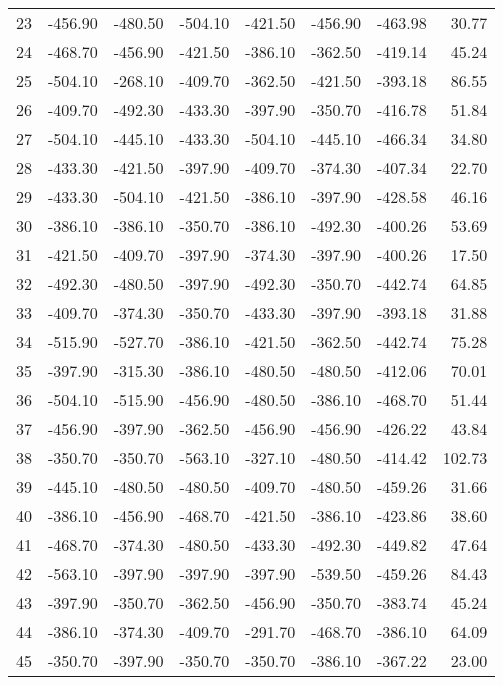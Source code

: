 \begin{longtable}{rrrrrrrr}
23 & -456.90 & -480.50 & -504.10 & -421.50 & -456.90 & -463.98 & 30.77  \\
24 & -468.70 & -456.90 & -421.50 & -386.10 & -362.50 & -419.14 & 45.24  \\
25 & -504.10 & -268.10 & -409.70 & -362.50 & -421.50 & -393.18 & 86.55  \\
26 & -409.70 & -492.30 & -433.30 & -397.90 & -350.70 & -416.78 & 51.84  \\
27 & -504.10 & -445.10 & -433.30 & -504.10 & -445.10 & -466.34 & 34.80  \\
28 & -433.30 & -421.50 & -397.90 & -409.70 & -374.30 & -407.34 & 22.70  \\
29 & -433.30 & -504.10 & -421.50 & -386.10 & -397.90 & -428.58 & 46.16  \\
30 & -386.10 & -386.10 & -350.70 & -386.10 & -492.30 & -400.26 & 53.69  \\
31 & -421.50 & -409.70 & -397.90 & -374.30 & -397.90 & -400.26 & 17.50  \\
32 & -492.30 & -480.50 & -397.90 & -492.30 & -350.70 & -442.74 & 64.85  \\
33 & -409.70 & -374.30 & -350.70 & -433.30 & -397.90 & -393.18 & 31.88  \\
34 & -515.90 & -527.70 & -386.10 & -421.50 & -362.50 & -442.74 & 75.28  \\
35 & -397.90 & -315.30 & -386.10 & -480.50 & -480.50 & -412.06 & 70.01  \\
36 & -504.10 & -515.90 & -456.90 & -480.50 & -386.10 & -468.70 & 51.44  \\
37 & -456.90 & -397.90 & -362.50 & -456.90 & -456.90 & -426.22 & 43.84  \\
38 & -350.70 & -350.70 & -563.10 & -327.10 & -480.50 & -414.42 & 102.73  \\
39 & -445.10 & -480.50 & -480.50 & -409.70 & -480.50 & -459.26 & 31.66  \\
40 & -386.10 & -456.90 & -468.70 & -421.50 & -386.10 & -423.86 & 38.60  \\
41 & -468.70 & -374.30 & -480.50 & -433.30 & -492.30 & -449.82 & 47.64  \\
42 & -563.10 & -397.90 & -397.90 & -397.90 & -539.50 & -459.26 & 84.43  \\
43 & -397.90 & -350.70 & -362.50 & -456.90 & -350.70 & -383.74 & 45.24  \\
44 & -386.10 & -374.30 & -409.70 & -291.70 & -468.70 & -386.10 & 64.09  \\
45 & -350.70 & -397.90 & -350.70 & -350.70 & -386.10 & -367.22 & 23.00  \\

\end{longtable}
